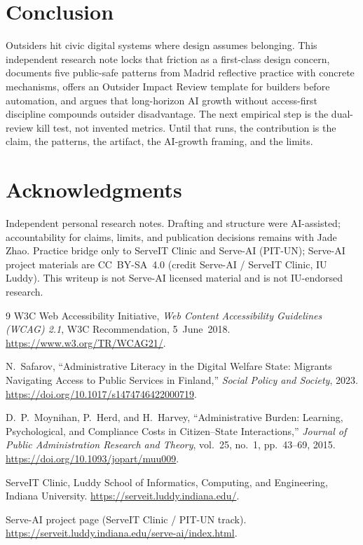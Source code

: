 \documentclass[10pt,twocolumn]{article}
\begin{document}
\section{Conclusion}
Outsiders hit civic digital systems where design assumes belonging. This
independent research note locks that friction as a first-class design concern,
documents five public-safe patterns from Madrid reflective practice with
concrete mechanisms, offers an Outsider Impact Review template for builders
before automation, and argues that long-horizon AI growth without access-first
discipline compounds outsider disadvantage. The next empirical step is the
dual-review kill test, not invented metrics. Until that runs, the contribution
is the claim, the patterns, the artifact, the AI-growth framing, and the limits.

\section*{Acknowledgments}
Independent personal research notes. Drafting and structure were AI-assisted;
accountability for claims, limits, and publication decisions remains with Jade
Zhao. Practice bridge only to ServeIT Clinic and Serve-AI (PIT-UN); Serve-AI
project materials are CC~BY-SA~4.0 (credit Serve-AI / ServeIT Clinic, IU Luddy).
This writeup is not Serve-AI licensed material and is not IU-endorsed research.

\begin{thebibliography}{9}
W3C Web Accessibility Initiative,
\textit{Web Content Accessibility Guidelines (WCAG) 2.1},
W3C Recommendation, 5~June~2018.
\url{https://www.w3.org/TR/WCAG21/}.

N.~Safarov,
``Administrative Literacy in the Digital Welfare State: Migrants Navigating
Access to Public Services in Finland,''
\textit{Social Policy and Society}, 2023.
\url{https://doi.org/10.1017/s1474746422000719}.

D.~P.~Moynihan, P.~Herd, and H.~Harvey,
``Administrative Burden: Learning, Psychological, and Compliance Costs in
Citizen--State Interactions,''
\textit{Journal of Public Administration Research and Theory},
vol.~25, no.~1, pp.~43--69, 2015.
\url{https://doi.org/10.1093/jopart/muu009}.

ServeIT Clinic, Luddy School of Informatics, Computing, and Engineering,
Indiana University.
\url{https://serveit.luddy.indiana.edu/}.

Serve-AI project page (ServeIT Clinic / PIT-UN track).
\url{https://serveit.luddy.indiana.edu/serve-ai/index.html}.
\end{thebibliography}
\end{document}
